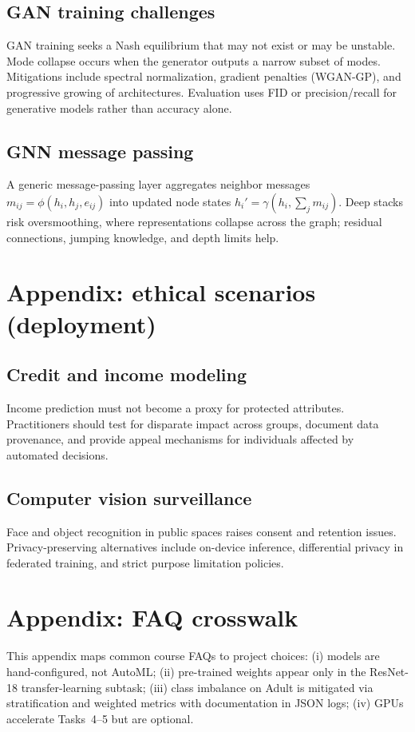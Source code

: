 \documentclass[11pt,a4paper]{article}
\begin{document}
\subsection*{GAN training challenges}
GAN training seeks a Nash equilibrium that may not exist or may be unstable. Mode collapse occurs when the generator outputs a narrow subset of modes. Mitigations include spectral normalization, gradient penalties (WGAN-GP), and progressive growing of architectures. Evaluation uses FID or precision/recall for generative models rather than accuracy alone.

\subsection*{GNN message passing}
A generic message-passing layer aggregates neighbor messages $m_{ij} = \phi(h_i,h_j,e_{ij})$ into updated node states $h_i' = \gamma(h_i,\sum_j m_{ij})$. Deep stacks risk oversmoothing, where representations collapse across the graph; residual connections, jumping knowledge, and depth limits help.

\section{Appendix: ethical scenarios (deployment)}
\subsection*{Credit and income modeling}
Income prediction must not become a proxy for protected attributes. Practitioners should test for disparate impact across groups, document data provenance, and provide appeal mechanisms for individuals affected by automated decisions.

\subsection*{Computer vision surveillance}
Face and object recognition in public spaces raises consent and retention issues. Privacy-preserving alternatives include on-device inference, differential privacy in federated training, and strict purpose limitation policies.

\section{Appendix: FAQ crosswalk}
This appendix maps common course FAQs to project choices: (i) models are hand-configured, not AutoML; (ii) pre-trained weights appear only in the ResNet-18 transfer-learning subtask; (iii) class imbalance on Adult is mitigated via stratification and weighted metrics with documentation in JSON logs; (iv) GPUs accelerate Tasks~4--5 but are optional.
\end{document}
